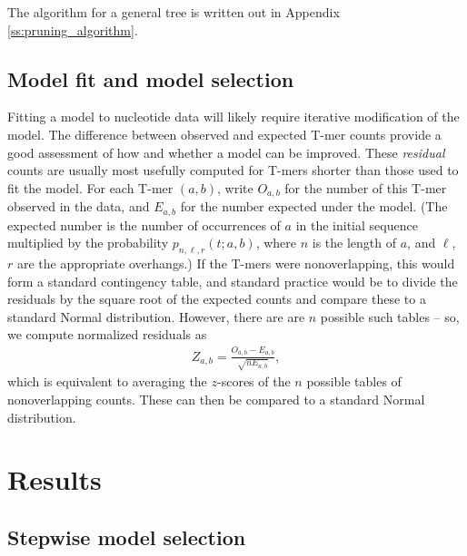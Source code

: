 \documentclass{article}
\theoremstyle{plain}
\theoremstyle{definition}
\begin{document}
The algorithm for a general tree is written out in Appendix \ref{ss:pruning_algorithm}.

\subsection{Model fit and model selection}
Fitting a model to nucleotide data will likely require iterative modification of the model.
The difference between observed and expected T-mer counts provide a good assessment of how and whether a model can be improved.
These \emph{residual} counts are usually most usefully computed for T-mers shorter than those used to fit the model.
For each T-mer $(a,b)$, write $O_{a,b}$ for the number of this T-mer observed in the data,
and $E_{a,b}$ for the number expected under the model.
(The expected number is the number of occurrences of $a$ in the initial sequence
multiplied by the probability $p_{n,\ell,r}(t;a,b)$, where $n$ is the length of $a$,
and $\ell$, $r$ are the appropriate overhangs.)
If the T-mers were nonoverlapping, this would form a standard contingency table,
and standard practice would be to divide the residuals by the square root of the expected counts
and compare these to a standard Normal distribution.
However, there are are $n$ possible such tables --
so, we compute normalized residuals as
\begin{align}
    Z_{a,b} = \frac{ O_{a,b} - E_{a,b} }{ \sqrt{n E_{a,b}} },
\end{align}
which is equivalent to averaging the $z$-scores of the $n$ possible tables of nonoverlapping counts.
These can then be compared to a standard Normal distribution.



\section{Results}

\subsection{Stepwise model selection}
\end{document}
